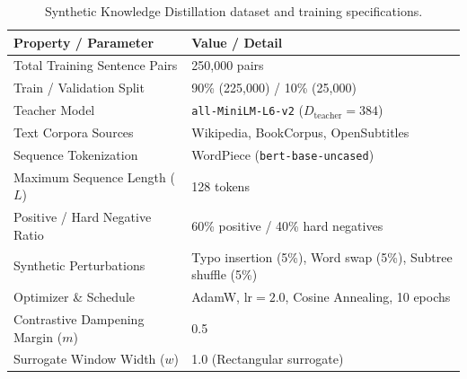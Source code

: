 \documentclass[10pt]{article} %
\begin{document}
\begin{table}[t!]
\caption{Synthetic Knowledge Distillation dataset and training specifications.}
\label{tab:dataset_specs}
\begin{center}
\begin{tabular}{ll}
\toprule
\textbf{Property / Parameter} & \textbf{Value / Detail} \\
\midrule
Total Training Sentence Pairs & 250,000 pairs \\
Train / Validation Split & 90\% (225,000) / 10\% (25,000) \\
Teacher Model & \texttt{all-MiniLM-L6-v2} ($D_{\text{teacher}}=384$) \\
Text Corpora Sources & Wikipedia, BookCorpus, OpenSubtitles \\
Sequence Tokenization & WordPiece (\texttt{bert-base-uncased}) \\
Maximum Sequence Length ($L$) & 128 tokens \\
Positive / Hard Negative Ratio & 60\% positive / 40\% hard negatives \\
Synthetic Perturbations & Typo insertion (5\%), Word swap (5\%), Subtree shuffle (5\%) \\
Optimizer \& Schedule & AdamW, $\text{lr}=2.0$, Cosine Annealing, 10 epochs \\
Contrastive Dampening Margin ($m$) & 0.5 \\
Surrogate Window Width ($w$) & 1.0 (Rectangular surrogate) \\
\bottomrule
\end{tabular}
\end{center}
\end{table}
\end{document}
